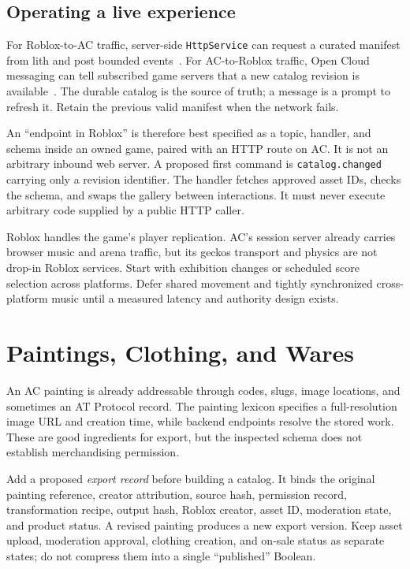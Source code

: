 \documentclass[10pt,letterpaper,twocolumn]{article}
\begin{document}
\subsection{Operating a live experience}
For Roblox-to-AC traffic, server-side \texttt{HttpService} can request a curated manifest from lith and post bounded events~\cite{http}. For AC-to-Roblox traffic, Open Cloud messaging can tell subscribed game servers that a new catalog revision is available~\cite{messaging}. The durable catalog is the source of truth; a message is a prompt to refresh it. Retain the previous valid manifest when the network fails.

An ``endpoint in Roblox'' is therefore best specified as a topic, handler, and schema inside an owned game, paired with an HTTP route on AC. It is not an arbitrary inbound web server. A proposed first command is \texttt{catalog.changed} carrying only a revision identifier. The handler fetches approved asset IDs, checks the schema, and swaps the gallery between interactions. It must never execute arbitrary code supplied by a public HTTP caller.

Roblox handles the game's player replication. AC's session server already carries browser music and arena traffic, but its geckos transport and physics are not drop-in Roblox services. Start with exhibition changes or scheduled score selection across platforms. Defer shared movement and tightly synchronized cross-platform music until a measured latency and authority design exists.

\section{Paintings, Clothing, and Wares}
An AC painting is already addressable through codes, slugs, image locations, and sometimes an AT Protocol record. The painting lexicon specifies a full-resolution image URL and creation time, while backend endpoints resolve the stored work. These are good ingredients for export, but the inspected schema does not establish merchandising permission.

Add a proposed \emph{export record} before building a catalog. It binds the original painting reference, creator attribution, source hash, permission record, transformation recipe, output hash, Roblox creator, asset ID, moderation state, and product status. A revised painting produces a new export version. Keep asset upload, moderation approval, clothing creation, and on-sale status as separate states; do not compress them into a single ``published'' Boolean.
\end{document}

